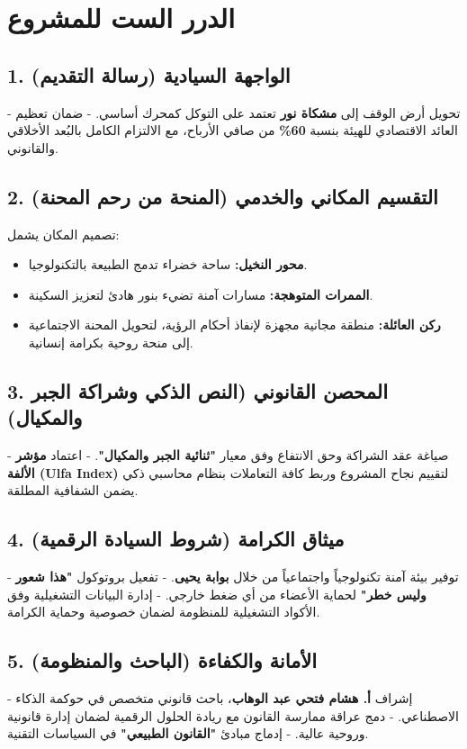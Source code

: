 \documentclass[12pt, a4paper]{article}
\begin{document}
\section*{الدرر الست للمشروع}

\subsection*{1. الواجهة السيادية (رسالة التقديم)}
- تحويل أرض الوقف إلى \textbf{مشكاة نور} تعتمد على التوكل كمحرك أساسي.  
- ضمان تعظيم العائد الاقتصادي للهيئة بنسبة \textbf{60\%} من صافي الأرباح، مع الالتزام الكامل بالبُعد الأخلاقي والقانوني.

\subsection*{2. التقسيم المكاني والخدمي (المنحة من رحم المحنة)}
تصميم المكان يشمل:  
\begin{itemize}
    \item \textbf{محور النخيل:} ساحة خضراء تدمج الطبيعة بالتكنولوجيا.  
    \item \textbf{الممرات المتوهجة:} مسارات آمنة تضيء بنور هادئ لتعزيز السكينة.  
    \item \textbf{ركن العائلة:} منطقة مجانية مجهزة لإنفاذ أحكام الرؤية، لتحويل المحنة الاجتماعية إلى منحة روحية بكرامة إنسانية.
\end{itemize}

\subsection*{3. المحصن القانوني (النص الذكي وشراكة الجبر والمكيال)}
- صياغة عقد الشراكة وحق الانتفاع وفق معيار \textbf{"ثنائية الجبر والمكيال"}.  
- اعتماد \textbf{مؤشر الألفة (Ulfa Index)} لتقييم نجاح المشروع وربط كافة التعاملات بنظام محاسبي ذكي يضمن الشفافية المطلقة.

\subsection*{4. ميثاق الكرامة (شروط السيادة الرقمية)}
- توفير بيئة آمنة تكنولوجياً واجتماعياً من خلال \textbf{بوابة يحيى}.  
- تفعيل بروتوكول \textbf{"هذا شعور وليس خطر"} لحماية الأعضاء من أي ضغط خارجي.  
- إدارة البيانات التشغيلية وفق الأكواد التشغيلية للمنظومة لضمان خصوصية وحماية الكرامة.

\subsection*{5. الأمانة والكفاءة (الباحث والمنظومة)}
- إشراف \textbf{أ. هشام فتحي عبد الوهاب}، باحث قانوني متخصص في حوكمة الذكاء الاصطناعي.  
- دمج عراقة ممارسة القانون مع ريادة الحلول الرقمية لضمان إدارة قانونية وروحية عالية.  
- إدماج مبادئ \textbf{"القانون الطبيعي"} في السياسات التقنية.
\end{document}
